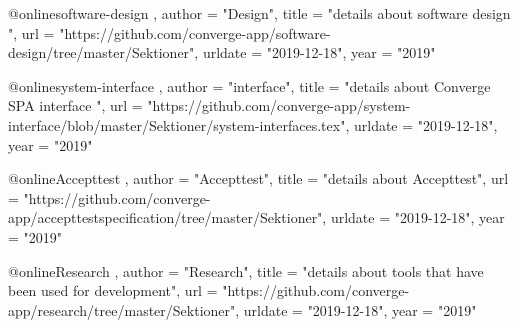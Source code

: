 @online{software-design ,
    author = "Design",
    title = "{details about software design }",
    url = "https://github.com/converge-app/software-design/tree/master/Sektioner",
    urldate = "2019-12-18",
    year = "2019"
}

@online{system-interface ,
    author = "interface",
    title = "{details about Converge SPA interface }",
    url = "https://github.com/converge-app/system-interface/blob/master/Sektioner/system-interfaces.tex",
    urldate = "2019-12-18",
    year = "2019"
}

@online{Accepttest ,
    author = "Accepttest",
    title = "{details about Accepttest}",
    url = "https://github.com/converge-app/accepttestspecification/tree/master/Sektioner",
    urldate = "2019-12-18",
    year = "2019"
}

@online{Research ,
    author = "Research",
    title = "{details about tools that have been used for development}",
    url = "https://github.com/converge-app/research/tree/master/Sektioner",
    urldate = "2019-12-18",
    year = "2019"
}